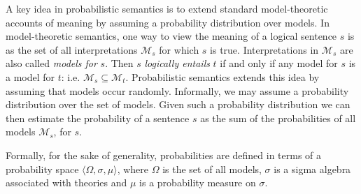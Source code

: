 \documentclass{svmult}
\begin{document}
A key idea in probabilistic semantics is to extend standard
model-theoretic accounts of meaning by assuming a probability
distribution over models.  In model-theoretic semantics, one way to
view the meaning of a logical sentence $s$ is as the set of all
interpretations $\mathcal{M}_s$ for which $s$ is true. Interpretations
in $\mathcal{M}_s$ are also called {\em models for\/} $s$. Then $s$
{\em logically entails\/} $t$ if and only if any model for $s$ is a
model for $t$: i.e. $\mathcal{M}_s \subseteq
\mathcal{M}_t$. Probabilistic semantics extends this idea by assuming
that models occur randomly. Informally, we may assume a probability
distribution over the set of models. Given such a probability
distribution we can then estimate the probability of a sentence $s$ as
the sum of the probabilities of all models $\mathcal{M}_s$, for $s$.

Formally, for the sake of generality, probabilities are defined in
terms of a probability space $\langle \Omega, \sigma, \mu\rangle$,
where $\Omega$ is the set of all models, $\sigma$ is a sigma algebra
associated with theories and $\mu$ is a probability measure on
$\sigma$.




\end{document}
